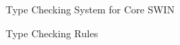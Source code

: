 \begin{section}{Type Checking System for Core SWIN}
\begin{subsection}{Type Checking Rules}


\end{subsection}
\end{section}
